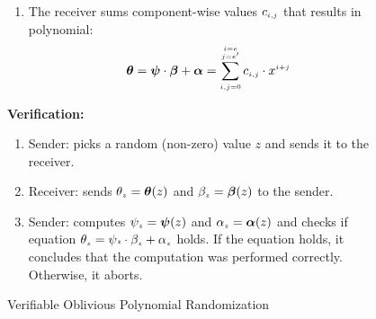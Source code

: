 \begin{figure}[ht]
\begin{center}
\begin{tcolorbox}[enhanced,width=4.75in,height=110mm,right=.5mm,
    drop fuzzy shadow southwest,
    colframe=black,colback=white]
\begin{enumerate}[leftmargin=-.2mm]
{\begin{enumerate}
 \item The receiver sums component-wise values $c_{\scriptscriptstyle i,j}$  that results in polynomial:
 \vspace{-3mm}
  $$\bm\theta=\bm\psi\cdot \bm\beta+\bm\alpha=\sum\limits^{\substack{\scriptscriptstyle i=e\\ \scriptscriptstyle j=e'}}_{\scriptscriptstyle i,j=0}c_{\scriptscriptstyle i, j}\cdot x^{\scriptscriptstyle i+j}$$ 
  \vspace{-3mm}
 




\end{enumerate}
\vspace{-1.6mm}
\item \label{Verification} \textbf{Verification:}
\begin{enumerate}%

\item \label{picking-random-x}Sender: picks a random (non-zero) value  $z$ and sends it to the receiver. 

\item\label{receiver-OLE-invocation} Receiver: sends $\theta_{\scriptscriptstyle z}=\bm\theta(z)$ and $\beta_{\scriptscriptstyle z}=\bm\beta(z)$ to the sender.

\item\label{receiver-OLE-invocation} Sender:  computes $\psi_{\scriptscriptstyle z}=\bm\psi(z)$ and $\alpha_{\scriptscriptstyle z}=\bm\alpha(z)$ and checks   if equation  $\theta_{\scriptscriptstyle z}=\psi{\scriptscriptstyle z}\cdot \beta_{\scriptscriptstyle z}+\alpha_{\scriptscriptstyle z}$ holds. If the equation holds, it concludes that the computation was performed correctly. Otherwise, it aborts. 
%
\end{enumerate}
}
 \end{enumerate}
 \end{tcolorbox}
\end{center}
\vspace{-5mm}
\caption{Verifiable Oblivious Polynomial Randomization} 
\label{fig:VOPR}
\vspace{-5mm}
\end{figure}
